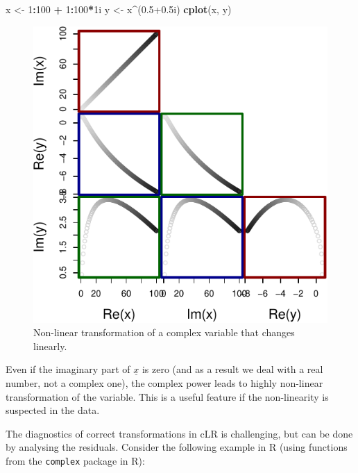 \documentclass[
]{book}
\newenvironment{Shaded}{\begin{snugshade}}{\end{snugshade}}
\newcommand{\DecValTok}[1]{\textcolor[rgb]{0.00,0.00,0.81}{#1}}
\newcommand{\FloatTok}[1]{\textcolor[rgb]{0.00,0.00,0.81}{#1}}
\newcommand{\KeywordTok}[1]{\textcolor[rgb]{0.13,0.29,0.53}{\textbf{#1}}}
\newcommand{\NormalTok}[1]{#1}
\newcommand{\OperatorTok}[1]{\textcolor[rgb]{0.81,0.36,0.00}{\textbf{#1}}}
\newcommand{\StringTok}[1]{\textcolor[rgb]{0.31,0.60,0.02}{#1}}
\begin{document}
\begin{Shaded}
\begin{Highlighting}[]
\NormalTok{x \textless{}{-}}\StringTok{ }\DecValTok{1}\OperatorTok{:}\DecValTok{100} \OperatorTok{+}\StringTok{ }\DecValTok{1}\OperatorTok{:}\DecValTok{100}\OperatorTok{*}\NormalTok{1i}
\NormalTok{y \textless{}{-}}\StringTok{ }\NormalTok{x}\OperatorTok{\^{}}\NormalTok{(}\FloatTok{0.5+0.5}\NormalTok{i)}
\KeywordTok{cplot}\NormalTok{(x, y)}
\end{Highlighting}
\end{Shaded}

\begin{figure}
\centering
\includegraphics{Svetunkov---Svetunkov---Complex-Valued-Econometrics_files/figure-latex/unnamed-chunk-33-1.pdf}
\caption{\label{fig:unnamed-chunk-33}Non-linear transformation of a complex variable that changes linearly.}
\end{figure}

Even if the imaginary part of \(\underline{x}\) is zero (and as a result we deal with a real number, not a complex one), the complex power leads to highly non-linear transformation of the variable. This is a useful feature if the non-linearity is suspected in the data.

The diagnostics of correct transformations in cLR is challenging, but can be done by analysing the residuals. Consider the following example in R (using functions from the \texttt{complex} package in R):
\end{document}
